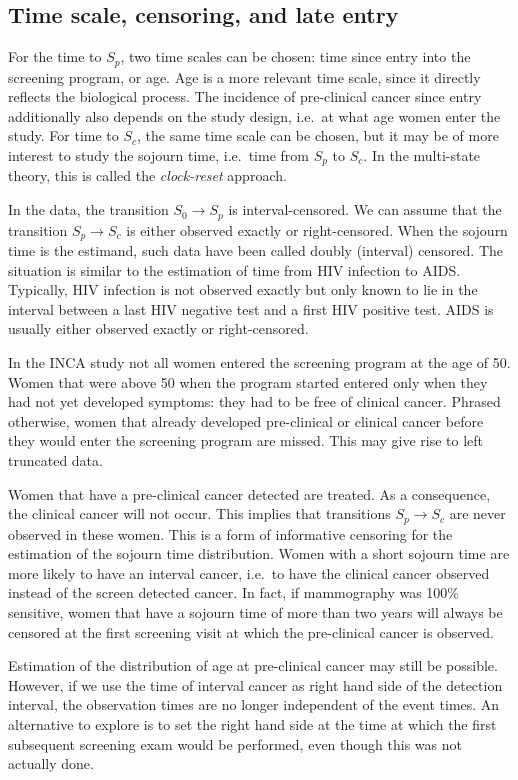 \documentclass{bmcart}
\begin{document}
\subsection*{Time scale, censoring, and late entry}
For the time to $S_p$, two time scales can be chosen: time since entry into the screening program,
or age. Age is a more relevant time scale, since it directly reflects the biological process. The
incidence of pre-clinical cancer since entry additionally also depends on the study design, i.e.\ 
at what age women enter the study. For time to $S_c$, the same time scale can be chosen, but it may
be of more interest to study the sojourn time, i.e.\ time from $S_p$ to $S_c$. In the multi-state
theory, this is called the \textit{clock-reset} approach.

In the data, the transition $S_0 \rightarrow S_p$ is interval-censored. We can assume that the
transition $S_p \rightarrow S_c$ is either observed exactly or right-censored. When the sojourn
time is the estimand, such data have been called doubly (interval) censored. The situation is
similar to the estimation of time from HIV infection to AIDS. Typically, HIV infection is not
observed exactly but only known to lie in the interval between a last HIV negative test and a first
HIV positive test. AIDS is usually either observed exactly or right-censored.

In the INCA study not all women entered the screening program at the age of 50. Women that were
above 50 when the program started entered only when they had not yet developed symptoms: they had
to be free of clinical cancer. Phrased otherwise, women that already developed pre-clinical or
clinical cancer before they would enter the screening program are missed. This may give rise to
left truncated data.
  
Women that have a pre-clinical cancer detected are treated. As a consequence, the clinical cancer
will not occur. This implies that transitions $S_p \rightarrow S_c$ are never observed in these
women. This is a form of informative censoring for the estimation of the sojourn time distribution.
Women with a short sojourn time are more likely to have an interval cancer, i.e.\  to have the
clinical cancer observed instead of the screen detected cancer. In fact, if mammography was 100\%
sensitive, women that have a sojourn time of more than two years will always be censored at the
first screening visit at which the pre-clinical cancer is observed. 

Estimation of the distribution of age at pre-clinical cancer may still be possible. However, if we
use the time of interval cancer as right hand side of the detection interval, the observation times
are no longer independent of the event times. An alternative to explore is to set the right hand
side at the time at which the first subsequent screening exam would be performed, even though this
was not actually done.
\end{document}
